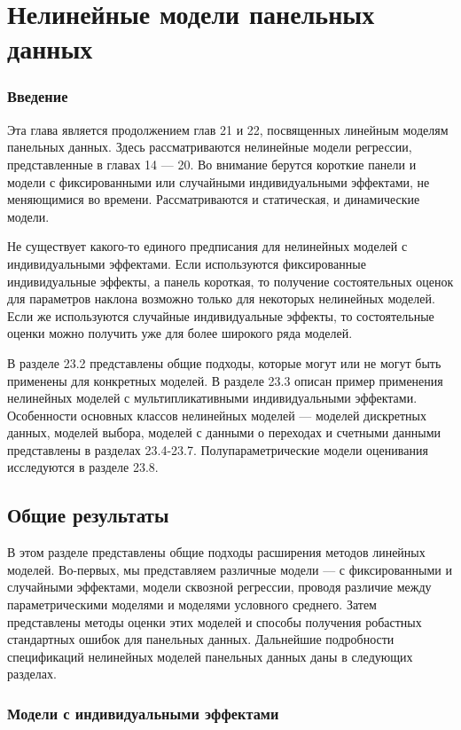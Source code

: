 
\chapter{Нелинейные модели панельных данных} 

\subsection{Введение}
Эта глава является продолжением глав 21 и 22, посвященных линейным моделям панельных данных. Здесь рассматриваются нелинейные модели регрессии, представленные в главах 14 --- 20. Во внимание берутся короткие панели и модели с фиксированными или случайными индивидуальными эффектами, не меняющимися во времени. Рассматриваются и статическая, и динамические модели.

Не существует какого-то единого предписания для нелинейных моделей с индивидуальными эффектами. Если используются фиксированные индивидуальные эффекты, а панель короткая, то получение состоятельных оценок для параметров наклона возможно только для некоторых нелинейных моделей. Если же используются случайные индивидуальные эффекты, то состоятельные оценки можно получить уже для более широкого ряда моделей.

В разделе 23.2 представлены общие подходы, которые могут или не могут быть применены для конкретных моделей. В разделе 23.3 описан пример применения нелинейных моделей с мультипликативными индивидуальными эффектами. Особенности основных классов нелинейных моделей --- моделей дискретных данных, моделей выбора, моделей с данными о переходах и счетными данными представлены в разделах 23.4-23.7. Полупараметрические модели оценивания исследуются в разделе 23.8.

\section{Общие результаты}

В этом разделе представлены общие подходы расширения методов линейных моделей. Во-первых, мы представляем различные модели --- с фиксированными и случайными эффектами, модели сквозной регрессии, проводя различие между параметрическими  моделями и моделями условного среднего. Затем представлены методы оценки этих моделей и способы получения робастных стандартных ошибок для панельных данных. Дальнейшие подробности спецификаций нелинейных моделей панельных данных даны в следующих разделах.

\subsection{Модели с индивидуальными эффектами}


